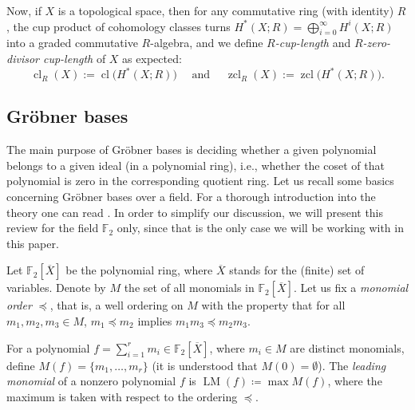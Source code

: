 \documentclass{amsart}
\theoremstyle{definition}
\theoremstyle{remark}
\numberwithin{equation}{section}
\newcommand{\F}{\mathbb F}
\newcommand{\lm}{\operatorname{LM}}
\newcommand{\cl}{\operatorname{cl}}
\newcommand{\zcl}{\operatorname{zcl}}
\begin{document}
\medskip

Now, if $X$ is a topological space, then for any commutative ring (with identity) $R$, the cup product of cohomology classes turns $H^*(X;R)=\bigoplus_{i=0}^\infty H^i(X;R)$ into a graded commutative $R$-algebra, and we define {\it $R$-cup-length} and {\it $R$-zero-divisor cup-length} of $X$ as expected:
\[\cl_R(X):=\cl\big(H^*(X;R)\big) \quad \mbox{ and } \quad \zcl_R(X):=\zcl\big(H^*(X;R)\big).\]




\subsection{Gr\"obner bases}
The main purpose of Gr\"obner bases is deciding whether a given polynomial belongs to a given ideal (in a polynomial ring), i.e., whether the coset of that polynomial is zero in the corresponding quotient ring.
Let us recall some basics concerning Gr\"obner bases over a field. For a thorough introduction into the theory one can read \cite[Chapter 5]{Becker}. In order to simplify our discussion, we will present this review for the field $\F_2$ only, since that is the only case we will be working with in this paper.

Let $\F_2[\overline X]$ be the polynomial ring, where $\overline X$ stands for the (finite) set of variables. Denote by $M$ the set of all monomials in $\F_2[\overline X]$. Let us fix a {\it monomial order} $\preceq$, that is, a well ordering on $M$ with the property that for all $m_1,m_2,m_3\in M$, $m_1\preceq m_2$ implies $m_1m_3\preceq m_2m_3$. 

For a polynomial $f = \sum_{i=1}^r m_i\in\F_2[\overline X]$, where $m_i\in M$ are distinct monomials, define $M(f)=\{m_1,\ldots,m_r\}$ (it is understood that $M(0)=\emptyset$). The {\it leading monomial} of a nonzero polynomial $f$ is $\lm(f)\coloneqq\max M(f)$, where the maximum is taken with respect to the ordering $\preceq$.    
\end{document}
